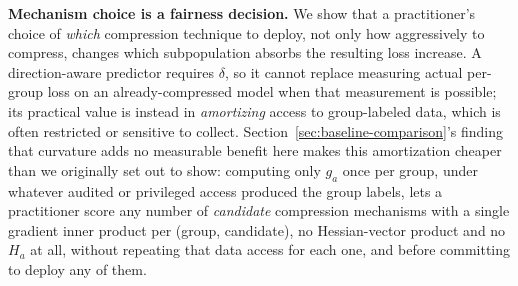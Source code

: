 \documentclass{article}
\begin{document}
\textbf{Mechanism choice is a fairness decision.} We show that a practitioner's choice of \emph{which} compression technique to deploy, not only how aggressively to compress, changes which subpopulation absorbs the resulting loss increase. A direction-aware predictor requires $\delta$, so it cannot replace measuring actual per-group loss on an already-compressed model when that measurement is possible; its practical value is instead in \emph{amortizing} access to group-labeled data, which is often restricted or sensitive to collect. Section~\ref{sec:baseline-comparison}'s finding that curvature adds no measurable benefit here makes this amortization cheaper than we originally set out to show: computing only $g_a$ once per group, under whatever audited or privileged access produced the group labels, lets a practitioner score any number of \emph{candidate} compression mechanisms with a single gradient inner product per (group, candidate), no Hessian-vector product and no $H_a$ at all, without repeating that data access for each one, and before committing to deploy any of them.
\end{document}
